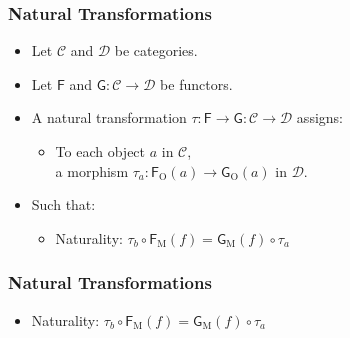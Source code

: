 \documentclass{beamer}
\DeclareMathOperator{\obj}{O}
\DeclareMathOperator{\mor}{M}
\newcommand{\comp}{\ensuremath{\mathrel{\circ}}}
\newcommand{\cat}[1]{\ensuremath{\mathcal{#1}}}
\newcommand{\func}[1]{\ensuremath{\mathsf{#1}}}
\newcommand{\funcO}[1]{\ensuremath{\func{#1}_{\obj}}}
\newcommand{\funcM}[1]{\ensuremath{\func{#1}_{\mor}}}
\newcommand{\nat}[1]{\ensuremath{#1}}
\newcommand{\natO}[2]{\ensuremath{\nat{#1}_{#2}}}
\begin{document}
\begin{frame}[label={def:natural}]
  \frametitle{Natural Transformations}

  \begin{definition}
    \begin{itemize}
    \item
      Let \cat{C} and \cat{D} be categories.
    \item
      Let \func{F} and $\func{G}: \cat{C} \to \cat{D}$ be functors.
    \item
      A natural transformation $\nat{\tau}: \func{F} \to \func{G}:
      \cat{C} \to \cat{D}$ assigns:
      \begin{itemize}
      \item
        To each object $a$ in \cat{C},\\ a morphism $\natO{\tau}{a}:
        \funcO{F}(a) \to \funcO{G}(a)$ in \cat{D}.
      \end{itemize}
    \item
      Such that:
      \begin{itemize}
      \item
        Naturality: $\natO{\tau}{b} \comp \funcM{F}(f) = \funcM{G}(f)
        \comp \natO{\tau}{a}$
      \end{itemize}
    \end{itemize}
  \end{definition}

\end{frame}


\begin{frame}
  \frametitle{Natural Transformations}

  \begin{definition}
    \begin{itemize}
    \item
      Naturality: $\natO{\tau}{b} \comp \funcM{F}(f) = \funcM{G}(f)
      \comp \natO{\tau}{a}$
    \end{itemize}
  \end{definition}
  \begin{center}
  \end{center}

\end{frame}
\end{document}
